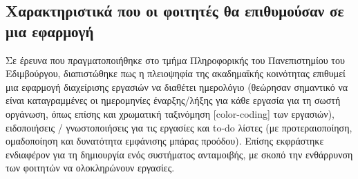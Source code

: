         \subsection{Χαρακτηριστικά που οι φοιτητές θα επιθυμούσαν σε μια εφαρμογή}
            Σε έρευνα \cite{Trujillo2020} που πραγματοποιήθηκε στο τμήμα Πληροφορικής του Πανεπιστημίου του Εδιμβούργου,
                διαπιστώθηκε πως η πλειοψηφία της ακαδημαϊκής κοινότητας επιθυμεί μια εφαρμογή διαχείρισης εργασιών να διαθέτει ημερολόγιο
                (θεώρησαν σημαντικό να είναι καταγραμμένες οι ημερομηνίες έναρξης/λήξης για κάθε εργασία για τη σωστή οργάνωση, όπως επίσης και χρωματική ταξινόμηση [color-coding] των εργασιών),
                ειδοποιήσεις / γνωστοποιήσεις για τις εργασίες και to-do λίστες (με προτεραιοποίηση, ομαδοποίηση και δυνατότητα εμφάνισης μπάρας προόδου).
            Επίσης εκφράστηκε ενδιαφέρον για τη δημιουργία ενός συστήματος ανταμοιβής, με σκοπό την ενθάρρυνση των φοιτητών να ολοκληρώνουν εργασίες.